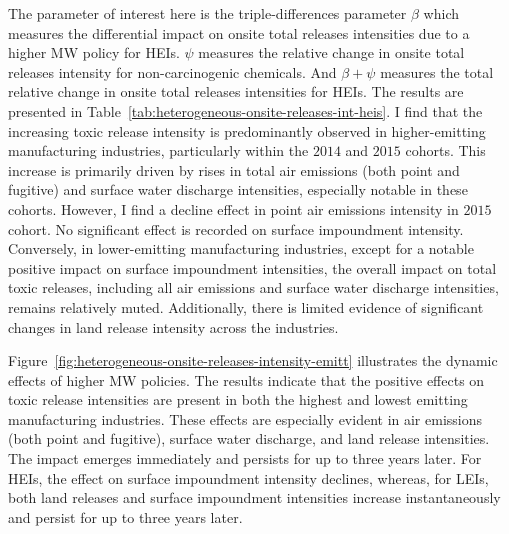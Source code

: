 \documentclass[12pt, english]{article}
\begin{document}
    The parameter of interest here is the triple-differences parameter $\beta$ which measures the differential impact on onsite total releases intensities due to a higher MW policy for HEIs. $\psi$ measures the relative change in onsite total releases intensity for non-carcinogenic chemicals. And $\beta + \psi$ measures the total relative change in onsite total releases intensities for HEIs. The results are presented in Table~\ref{tab:heterogeneous-onsite-releases-int-heis}. I find that the increasing toxic release intensity is predominantly observed in higher-emitting manufacturing industries, particularly within the $2014$ and $2015$ cohorts. This increase is primarily driven by rises in total air emissions (both point and fugitive) and surface water discharge intensities, especially notable in these cohorts. However, I find a decline effect in point air emissions intensity in $2015$ cohort. No significant effect is recorded on surface impoundment intensity. Conversely, in lower-emitting manufacturing industries, except for a notable positive impact on surface impoundment intensities, the overall impact on total toxic releases, including all air emissions and surface water discharge intensities, remains relatively muted. Additionally, there is limited evidence of significant changes in land release intensity across the industries.
    

    Figure~\ref{fig:heterogeneous-onsite-releases-intensity-emitt} illustrates the dynamic effects of higher MW policies. The results indicate that the positive effects on toxic release intensities are present in both the highest and lowest emitting manufacturing industries. These effects are especially evident in air emissions (both point and fugitive), surface water discharge, and land release intensities. The impact emerges immediately and persists for up to three years later. For HEIs, the effect on surface impoundment intensity declines, whereas, for LEIs, both land releases and surface impoundment intensities increase instantaneously and persist for up to three years later.
\end{document}
